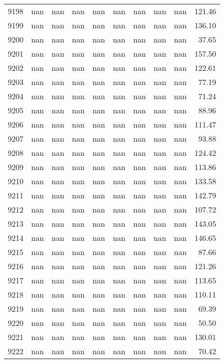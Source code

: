 \begin{tabular}{lrrrrrrrrr}
9198 & nan & nan & nan & nan & nan & nan & nan & nan & 121.46 \\
9199 & nan & nan & nan & nan & nan & nan & nan & nan & 136.10 \\
9200 & nan & nan & nan & nan & nan & nan & nan & nan & 37.65 \\
9201 & nan & nan & nan & nan & nan & nan & nan & nan & 157.50 \\
9202 & nan & nan & nan & nan & nan & nan & nan & nan & 122.61 \\
9203 & nan & nan & nan & nan & nan & nan & nan & nan & 77.19 \\
9204 & nan & nan & nan & nan & nan & nan & nan & nan & 71.24 \\
9205 & nan & nan & nan & nan & nan & nan & nan & nan & 88.96 \\
9206 & nan & nan & nan & nan & nan & nan & nan & nan & 111.47 \\
9207 & nan & nan & nan & nan & nan & nan & nan & nan & 93.88 \\
9208 & nan & nan & nan & nan & nan & nan & nan & nan & 124.42 \\
9209 & nan & nan & nan & nan & nan & nan & nan & nan & 113.86 \\
9210 & nan & nan & nan & nan & nan & nan & nan & nan & 133.58 \\
9211 & nan & nan & nan & nan & nan & nan & nan & nan & 142.79 \\
9212 & nan & nan & nan & nan & nan & nan & nan & nan & 107.72 \\
9213 & nan & nan & nan & nan & nan & nan & nan & nan & 143.05 \\
9214 & nan & nan & nan & nan & nan & nan & nan & nan & 146.65 \\
9215 & nan & nan & nan & nan & nan & nan & nan & nan & 87.66 \\
9216 & nan & nan & nan & nan & nan & nan & nan & nan & 121.26 \\
9217 & nan & nan & nan & nan & nan & nan & nan & nan & 113.65 \\
9218 & nan & nan & nan & nan & nan & nan & nan & nan & 110.11 \\
9219 & nan & nan & nan & nan & nan & nan & nan & nan & 69.39 \\
9220 & nan & nan & nan & nan & nan & nan & nan & nan & 50.50 \\
9221 & nan & nan & nan & nan & nan & nan & nan & nan & 130.01 \\
9222 & nan & nan & nan & nan & nan & nan & nan & nan & 70.42 \\

\end{tabular}
